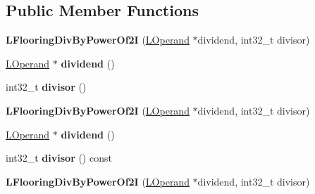 \subsection*{Public Member Functions}
\begin{DoxyCompactItemize}
\item 
{\bfseries L\+Flooring\+Div\+By\+Power\+Of2I} (\hyperlink{classv8_1_1internal_1_1_l_operand}{L\+Operand} $\ast$dividend, int32\+\_\+t divisor)\hypertarget{classv8_1_1internal_1_1_l_flooring_div_by_power_of2_i_a1dd3730a11d9841227cfb9e917532a0d}{}\label{classv8_1_1internal_1_1_l_flooring_div_by_power_of2_i_a1dd3730a11d9841227cfb9e917532a0d}

\item 
\hyperlink{classv8_1_1internal_1_1_l_operand}{L\+Operand} $\ast$ {\bfseries dividend} ()\hypertarget{classv8_1_1internal_1_1_l_flooring_div_by_power_of2_i_aee291ceb584b7a64ac7eaa1031c2a8cc}{}\label{classv8_1_1internal_1_1_l_flooring_div_by_power_of2_i_aee291ceb584b7a64ac7eaa1031c2a8cc}

\item 
int32\+\_\+t {\bfseries divisor} ()\hypertarget{classv8_1_1internal_1_1_l_flooring_div_by_power_of2_i_add8008d5ac66988cdbd9cec436d070e0}{}\label{classv8_1_1internal_1_1_l_flooring_div_by_power_of2_i_add8008d5ac66988cdbd9cec436d070e0}

\item 
{\bfseries L\+Flooring\+Div\+By\+Power\+Of2I} (\hyperlink{classv8_1_1internal_1_1_l_operand}{L\+Operand} $\ast$dividend, int32\+\_\+t divisor)\hypertarget{classv8_1_1internal_1_1_l_flooring_div_by_power_of2_i_a1dd3730a11d9841227cfb9e917532a0d}{}\label{classv8_1_1internal_1_1_l_flooring_div_by_power_of2_i_a1dd3730a11d9841227cfb9e917532a0d}

\item 
\hyperlink{classv8_1_1internal_1_1_l_operand}{L\+Operand} $\ast$ {\bfseries dividend} ()\hypertarget{classv8_1_1internal_1_1_l_flooring_div_by_power_of2_i_aee291ceb584b7a64ac7eaa1031c2a8cc}{}\label{classv8_1_1internal_1_1_l_flooring_div_by_power_of2_i_aee291ceb584b7a64ac7eaa1031c2a8cc}

\item 
int32\+\_\+t {\bfseries divisor} () const \hypertarget{classv8_1_1internal_1_1_l_flooring_div_by_power_of2_i_a648d12a68de8a628313a5b7cc1c3fbeb}{}\label{classv8_1_1internal_1_1_l_flooring_div_by_power_of2_i_a648d12a68de8a628313a5b7cc1c3fbeb}

\item 
{\bfseries L\+Flooring\+Div\+By\+Power\+Of2I} (\hyperlink{classv8_1_1internal_1_1_l_operand}{L\+Operand} $\ast$dividend, int32\+\_\+t divisor)\hypertarget{classv8_1_1internal_1_1_l_flooring_div_by_power_of2_i_a1dd3730a11d9841227cfb9e917532a0d}{}\label{classv8_1_1internal_1_1_l_flooring_div_by_power_of2_i_a1dd3730a11d9841227cfb9e917532a0d}


\end{DoxyCompactItemize}
